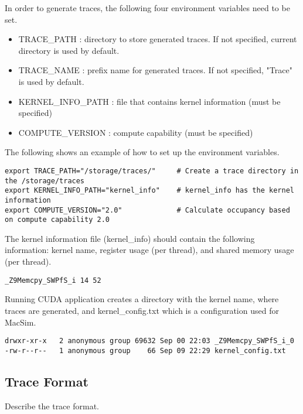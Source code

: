 In order to generate traces, the following four environment variables need to be set.

\begin{itemize}\itemsep2pt
\item TRACE\_PATH : directory to store generated traces. If not specified, current directory is used by default.
\item TRACE\_NAME : prefix name for generated traces. If not specified, "Trace" is used by default.
\item KERNEL\_INFO\_PATH : file that contains kernel information (must be specified)
\item COMPUTE\_VERSION : compute capability (must be specified)
\end{itemize}

The following shows an example of how to set up the environment variables.

\smallskip
\begin{lstlisting}
export TRACE_PATH="/storage/traces/"     # Create a trace directory in the /storage/traces
export KERNEL_INFO_PATH="kernel_info"    # kernel_info has the kernel information
export COMPUTE_VERSION="2.0"             # Calculate occupancy based on compute capability 2.0
\end{lstlisting}
\smallskip

The kernel information file (kernel\_info) should contain the following
information: kernel name, register usage (per thread), and shared memory usage
(per thread).

\smallskip
\begin{lstlisting}
_Z9Memcpy_SWPfS_i 14 52 
\end{lstlisting}
\smallskip

Running CUDA application creates a directory with the kernel name, where traces 
are generated, and kernel\_config.txt which is a configuration used for MacSim.

\smallskip
\begin{lstlisting}
drwxr-xr-x   2 anonymous group 69632 Sep 00 22:03 _Z9Memcpy_SWPfS_i_0
-rw-r--r--   1 anonymous group    66 Sep 09 22:29 kernel_config.txt
\end{lstlisting}
\smallskip


\subsection{Trace Format}

Describe the trace format.




